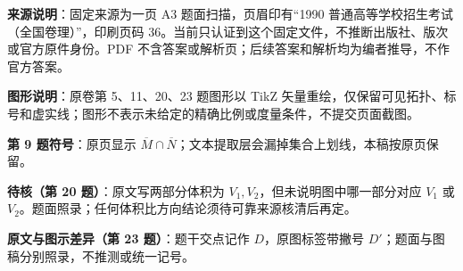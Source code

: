 

\begin{gktip}
\textbf{来源说明}：固定来源为一页 A3 题面扫描，页眉印有“1990 普通高等学校招生考试（全国卷理）”，印刷页码 36。当前只认证到这个固定文件，不推断出版社、版次或官方原件身份。PDF 不含答案或解析页；后续答案和解析均为编者推导，不作官方答案。

\textbf{图形说明}：原卷第 5、11、20、23 题图形以 TikZ 矢量重绘，仅保留可见拓扑、标号和虚实线；图形不表示未给定的精确比例或度量条件，不提交页面截图。

\textbf{第 9 题符号}：原页显示 $\overline{M}\cap\overline{N}$；文本提取层会漏掉集合上划线，本稿按原页保留。

\textbf{待核（第 20 题）}：原文写两部分体积为 $V_1,V_2$，但未说明图中哪一部分对应 $V_1$ 或 $V_2$。题面照录；任何体积比方向结论须待可靠来源核清后再定。

\textbf{原文与图示差异（第 23 题）}：题干交点记作 $D$，原图标签带撇号 $D'$；题面与图稿分别照录，不推测或统一记号。
\end{gktip}



